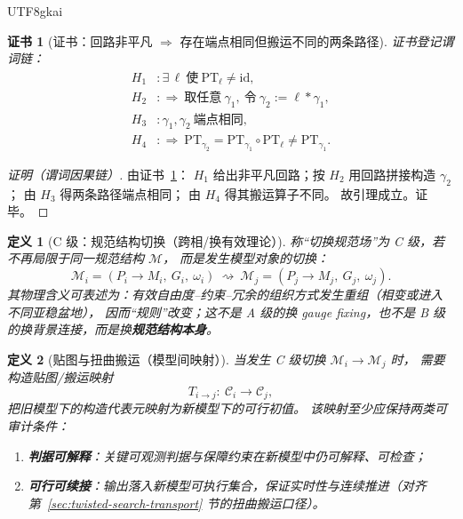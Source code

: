 \documentclass[12pt]{article}
\newtheorem{definition}{定义}[section]
\newtheorem{Certificate}{证书}[section]
\newcommand{\Base}{\ensuremath{M}}
\newcommand{\Bundle}{\ensuremath{P}}
\newcommand{\Group}{\ensuremath{G}}
\newcommand{\Conn}{\ensuremath{\omega}}
\begin{document}
\begin{CJK*}{UTF8}{gkai}
\begin{Certificate}[证书：回路非平凡 $\Rightarrow$ 存在端点相同但搬运不同的两条路径]
\label{cert:holonomy-implies-path-class-relevant}
证书登记谓词链：
\[
\begin{aligned}
  H_1 &: \exists\,\ell\ \text{使}\ \mathrm{PT}_{\ell}\neq \mathrm{id},\\
  H_2 &: \Rightarrow\ \text{取任意}\ \gamma_1,\ \text{令}\ \gamma_2:=\ell\ast\gamma_1,\\
  H_3 &: \gamma_1,\gamma_2\ \text{端点相同},\\
  H_4 &: \Rightarrow\ \mathrm{PT}_{\gamma_2}=\mathrm{PT}_{\gamma_1}\circ \mathrm{PT}_{\ell}\neq \mathrm{PT}_{\gamma_1}.
\end{aligned}
\]
\end{Certificate}

\begin{proof}[证明（谓词因果链）]
由证书~\ref{cert:holonomy-implies-path-class-relevant}：
$H_1$ 给出非平凡回路；按 $H_2$ 用回路拼接构造 $\gamma_2$；
由 $H_3$ 得两条路径端点相同；
由 $H_4$ 得其搬运算子不同。
故引理成立。证毕。
\end{proof}

\begin{definition}[C 级：规范结构切换（跨相/换有效理论）]
称“切换规范场”为 C 级，若不再局限于同一规范结构 $\mathcal{M}$，
而是发生模型对象的切换：
\[
  \mathcal{M}_i=(\Bundle_i\to\Base_i,\ \Group_i,\ \Conn_i)\ \rightsquigarrow\
  \mathcal{M}_j=(\Bundle_j\to\Base_j,\ \Group_j,\ \Conn_j).
\]
其物理含义可表述为：有效自由度--约束--冗余的组织方式发生重组（相变或进入不同亚稳盆地），
因而“规则”改变；这不是 A 级的换 gauge fixing，也不是 B 级的换背景连接，而是换\textbf{规范结构本身}。
\end{definition}

\begin{definition}[贴图与扭曲搬运（模型间映射）]
当发生 C 级切换 $\mathcal{M}_i\to\mathcal{M}_j$ 时，
需要构造贴图/搬运映射
\[
  T_{i\to j}:\ \mathcal{C}_i\to \mathcal{C}_j,
\]
把旧模型下的构造代表元映射为新模型下的可行初值。
该映射至少应保持两类可审计条件：
\begin{enumerate}
  \item \textbf{判据可解释}：关键可观测判据与保障约束在新模型中仍可解释、可检查；
  \item \textbf{可行可续接}：输出落入新模型可执行集合，保证实时性与连续推进（对齐第~\ref{sec:twisted-search-transport} 节的扭曲搬运口径）。
\end{enumerate}
\end{definition}


\end{CJK*}
\end{document}
